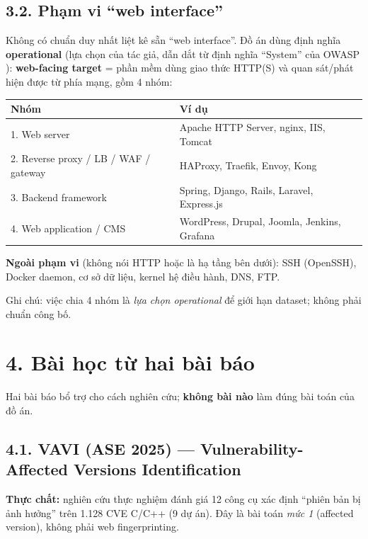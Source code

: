 \documentclass[11pt,a4paper]{article}
\begin{document}
\subsection*{3.2. Phạm vi ``web interface''}

Không có chuẩn duy nhất liệt kê sẵn ``web interface''. Đồ án dùng định nghĩa \textbf{operational} (lựa chọn của tác giả, dẫn dắt từ định nghĩa ``System'' của OWASP \cite{owasp}): \textbf{web-facing target} = phần mềm dùng giao thức HTTP(S) và quan sát/phát hiện được từ phía mạng, gồm 4 nhóm:

\begin{center}
\begin{tabular}{@{}ll@{}}
\toprule
\textbf{Nhóm} & \textbf{Ví dụ} \\
\midrule
1. Web server & Apache HTTP Server, nginx, IIS, Tomcat \\
2. Reverse proxy / LB / WAF / gateway & HAProxy, Traefik, Envoy, Kong \\
3. Backend framework & Spring, Django, Rails, Laravel, Express.js \\
4. Web application / CMS & WordPress, Drupal, Joomla, Jenkins, Grafana \\
\bottomrule
\end{tabular}
\end{center}

\textbf{Ngoài phạm vi} (không nói HTTP hoặc là hạ tầng bên dưới): SSH (OpenSSH), Docker daemon, cơ sở dữ liệu, kernel hệ điều hành, DNS, FTP.

Ghi chú: việc chia 4 nhóm là \emph{lựa chọn operational} để giới hạn dataset; không phải chuẩn công bố.

\section*{4. Bài học từ hai bài báo}

Hai bài báo bổ trợ cho cách nghiên cứu; \textbf{không bài nào} làm đúng bài toán của đồ án.

\subsection*{4.1. VAVI (ASE 2025) — Vulnerability-Affected Versions Identification \cite{vavi}}

\textbf{Thực chất:} nghiên cứu thực nghiệm đánh giá 12 công cụ xác định ``phiên bản bị ảnh hưởng'' trên 1.128 CVE C/C++ (9 dự án). Đây là bài toán \emph{mức 1} (affected version), không phải web fingerprinting.
\end{document}
